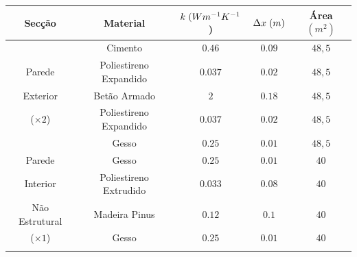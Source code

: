 \documentclass[12pt, a4paper]{article}
\begin{document}
\begin{table}[htpb]
	\begin{center}
		\begin{tabular}{c c c c c}
			\toprule{}
			Secção                     & Material               & $ k \hspace{1mm} (Wm^{-1}K^{-1}$) & $ \Delta x \hspace{1mm} (m)$ & Área $(m^2) $ \\
				\midrule{}

			\multirow{5}{*}{}          & Cimento                & $0.46$                            & $0.09$                       & $48,5$          \\
				\cline{2-5}
			Parede                     & Poliestireno Expandido & $0.037$                           & $0.02$                       & $48,5$          \\
				\cline{2-5}
			Exterior                   & Betão Armado           & $2$                               & $0.18$                       & $48,5$          \\
				\cline{2-5}
			($\times 2$)               & Poliestireno Expandido & $0.037$                           & $0.02$                       & $48,5$          \\
				\cline{2-5}
			                           & Gesso                  & $0.25$                            & $0.01$                       & $48,5$          \\
				\midrule{}

			Parede \multirow{4}{*}{}   & Gesso                  & $0.25$                            & $0.01$                       & $40$          \\
				\cline{2-5}
			Interior                   & Poliestireno Extrudido & $0.033$                           & $0.08$                       & $40$          \\
				\cline{2-5}
			Não Estrutural             & Madeira Pinus          & $0.12$                            & $0.1$                        & $40$          \\
				\cline{2-5}
			($\times 1$)               & Gesso                  & $0.25$                            & $0.01$                       & $40$          \\
				\midrule{}


\end{tabular}
\end{center}
\end{table}
\end{document}
